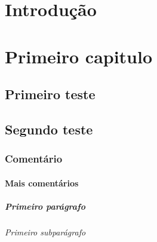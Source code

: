 \chapter*{Introdução}
	\lipsum

\chapter{Primeiro capitulo}		
	\section{Primeiro teste}
		\lipsum[1]

\section{Segundo teste}	
	\subsection{Comentário}
		\lipsum[2]

		\subsubsection{Mais comentários}
			\lipsum[3]

			\paragraph{Primeiro parágrafo}
				\lipsum[4]

				\subparagraph{Primeiro subparágrafo}
					\lipsum[5]